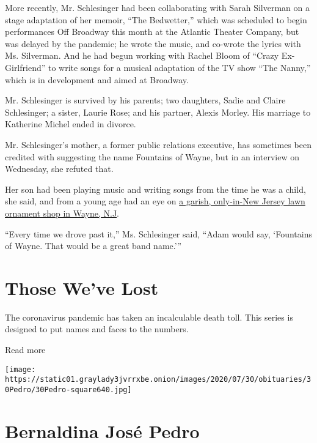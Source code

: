 More recently, Mr. Schlesinger had been collaborating with Sarah
Silverman on a stage adaptation of her memoir, ``The Bedwetter,'' which
was scheduled to begin performances Off Broadway this month at the
Atlantic Theater Company, but was delayed by the pandemic; he wrote the
music, and co-wrote the lyrics with Ms. Silverman. And he had begun
working with Rachel Bloom of ``Crazy Ex-Girlfriend'' to write songs for
a musical adaptation of the TV show ``The Nanny,'' which is in
development and aimed at Broadway.

Mr. Schlesinger is survived by his parents; two daughters, Sadie and
Claire Schlesinger; a sister, Laurie Rose; and his partner, Alexis
Morley. His marriage to Katherine Michel ended in divorce.

Mr. Schlesinger's mother, a former public relations executive, has
sometimes been credited with suggesting the name Fountains of Wayne, but
in an interview on Wednesday, she refuted that.

Her son had been playing music and writing songs from the time he was a
child, she said, and from a young age had an eye on
\href{https://www.roadsideamerica.com/blog/end-fountains-of-wayne/}{a
garish, only-in-New Jersey lawn ornament shop in Wayne, N.J}.

``Every time we drove past it,'' Ms. Schlesinger said, ``Adam would say,
`Fountains of Wayne. That would be a great band name.'''

\href{https://www.nytimes3xbfgragh.onion/interactive/2020/obituaries/people-died-coronavirus-obituaries.html?action=click\&pgtype=Article\&state=default\&region=BELOW_MAIN_CONTENT\&context=covid_obits_promo}{}

\hypertarget{those-weve-lost}{%
\section{Those We've Lost}\label{those-weve-lost}}

The coronavirus pandemic has taken an incalculable death toll. This
series is designed to put names and faces to the numbers.

Read more

\texttt{[image: https://static01.graylady3jvrrxbe.onion/images/2020/07/30/obituaries/30Pedro/30Pedro-square640.jpg]}

\hypertarget{bernaldina-josuxe9-pedro}{%
\section{Bernaldina José Pedro}\label{bernaldina-josuxe9-pedro}}

